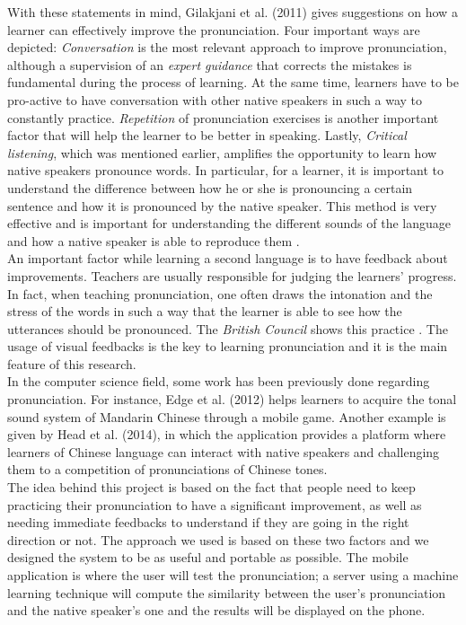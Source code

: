 \noindent With these statements in mind, Gilakjani et al. (2011) gives suggestions on how a learner can effectively improve the pronunciation. Four important ways are depicted: \textit{Conversation} is the most relevant approach to improve pronunciation, although a supervision of an \textit{expert guidance} that corrects the mistakes is fundamental during the process of learning. At the same time, learners have to be pro-active to have conversation with other native speakers in such a way to constantly practice. \textit{Repetition} of pronunciation exercises is another important factor that will help the learner to be better in speaking. Lastly, \textit{Critical listening}, which was mentioned earlier, amplifies the opportunity to learn how native speakers pronounce words. In particular, for a learner, it is important to understand the difference between how he or she is pronouncing a certain sentence and how it is pronounced by the native speaker. This method is very effective and is important for understanding the different sounds of the language and how a native speaker is able to reproduce them \cite{rost2014listening}.\\

\noindent An important factor while learning a second language is to have feedback about improvements. Teachers are usually responsible for judging the learners' progress. In fact, when teaching pronunciation, one often draws the intonation and the stress of the words in such a way that the learner is able to see how the utterances should be pronounced. The \textit{British Council} shows this practice \cite{bbc_stress}. The usage of visual feedbacks is the key to learning pronunciation and it is the main feature of this research. \\

\noindent In the computer science field, some work has been previously done regarding pronunciation. For instance, Edge et al. (2012) helps learners to acquire the tonal sound system of Mandarin Chinese through a mobile game. Another example is given by Head et al. (2014), in which the application provides a platform where learners of Chinese language can interact with native speakers and challenging them to a competition of pronunciations of Chinese tones. \\

\noindent The idea behind this project is based on the fact that people need to keep practicing their pronunciation to have a significant improvement, as well as needing immediate feedbacks to understand if they are going in the right direction or not. The approach we used is based on these two factors and we designed the system to be as useful and portable as possible. The mobile application is where the user will test the pronunciation; a server using a machine learning technique will compute the similarity between the user's pronunciation and the native speaker's one and the results will be displayed on the phone. \\

